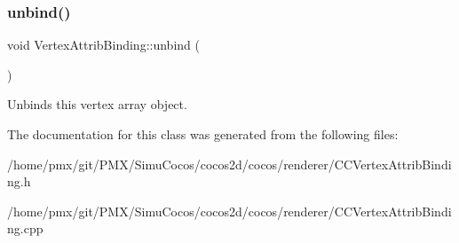 \subsubsection{\texorpdfstring{unbind()}{unbind()}\hspace{0.1cm}{\footnotesize\ttfamily [2/2]}}
{\footnotesize\ttfamily void Vertex\+Attrib\+Binding\+::unbind (\begin{DoxyParamCaption}{ }\end{DoxyParamCaption})}

Unbinds this vertex array object. 

The documentation for this class was generated from the following files\+:\begin{DoxyCompactItemize}
\item 
/home/pmx/git/\+P\+M\+X/\+Simu\+Cocos/cocos2d/cocos/renderer/C\+C\+Vertex\+Attrib\+Binding.\+h\item 
/home/pmx/git/\+P\+M\+X/\+Simu\+Cocos/cocos2d/cocos/renderer/C\+C\+Vertex\+Attrib\+Binding.\+cpp\end{DoxyCompactItemize}
